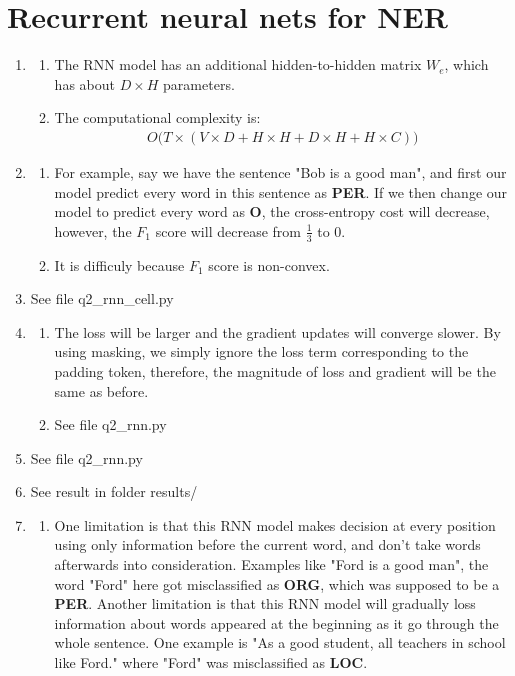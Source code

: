 \documentclass[10pt, a4paper]{ctexart}
\begin{document}
\section{Recurrent neural nets for NER}
\begin{enumerate}
    \item {
        \begin{enumerate}
            \item The RNN model has an additional hidden-to-hidden matrix $W_e$, which has about $D\times H$ parameters.
            \item The computational complexity is: {
                \begin{align*}
                    O\big(T\times (V\times D+H\times H+D\times H+H\times C)\big)
                \end{align*}
            }
        \end{enumerate}
    }
    \item {
        \begin{enumerate}
            \item For example, say we have the sentence "Bob is a good man", and first our model predict every word in this sentence as {\bf{PER}}. If we then change our model to predict every word as {\bf{O}}, the cross-entropy cost will decrease, however, the $F_1$ score will decrease from $\frac{1}{3}$ to $0$.
            \item It is difficuly because $F_1$ score is non-convex.
        \end{enumerate}
    }
    \item See file q2\_rnn\_cell.py
    \item {
        \begin{enumerate}
            \item The loss will be larger and the gradient updates will converge slower. By using masking, we simply ignore the loss term corresponding to the padding token, therefore, the magnitude of loss and gradient will be the same as before.
            \item See file q2\_rnn.py
        \end{enumerate}
    }
    \item See file q2\_rnn.py
    \item See result in folder results/
    \item {
        \begin{enumerate}
            \item One limitation is that this RNN model makes decision at every position using only information before the current word, and don't take words afterwards into consideration. Examples like "Ford is a good man", the word "Ford" here got misclassified as {\bf{ORG}}, which was supposed to be a {\bf{PER}}. Another limitation is that this RNN model will gradually loss information about words appeared at the beginning as it go through the whole sentence. One example is "As a good student, all teachers in school like Ford." where "Ford" was misclassified as {\bf{LOC}}.

\end{enumerate}}
\end{enumerate}
\end{document}
